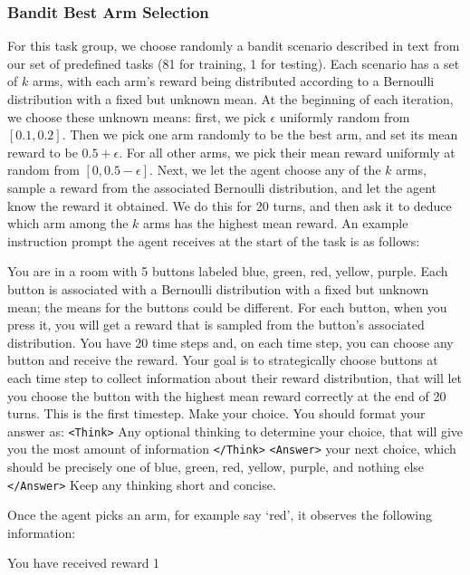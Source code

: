 \documentclass{article}
\theoremstyle{plain}
\theoremstyle{definition}
\theoremstyle{remark}
\begin{document}
\subsubsection{Bandit Best Arm Selection}
For this task group, we choose randomly a bandit scenario described in text from our set of predefined tasks (81 for training, 1 for testing). Each scenario has a set of $k$ arms, with each arm's reward being distributed according to a Bernoulli distribution with a fixed but unknown mean. At the beginning of each iteration, we choose these unknown means: first, we pick $\epsilon$ uniformly random from $[0.1, 0.2]$. Then we pick one arm randomly to be the best arm, and set its mean reward to be $0.5 + \epsilon$. For all other arms, we pick their mean reward uniformly at random from $[0, 0.5 - \epsilon]$.
Next, we let the agent choose any of the $k$ arms, sample a reward from the associated Bernoulli distribution, and let the agent know the reward it obtained. We do this for 20 turns, and then ask it to deduce which arm among the $k$ arms has the highest mean reward.
An example instruction prompt the agent receives at the start of the task is as follows:
\begin{tcolorbox}[colback=gray!20, colframe=black, title=Bandit Best Arm Selection Agent Prompt]
You are in a room with 5 buttons labeled blue, green, red, yellow, purple. Each button is associated with a Bernoulli distribution with a fixed but unknown mean; the means for the buttons could be different. For each button, when you press it, you will get a reward that is sampled from the button's associated distribution. You have 20 time steps and, on each time step, you can choose any button and receive the reward.
Your goal is to strategically choose buttons at each time step to collect information about their reward distribution, that will let you choose the button with the highest mean reward correctly at the end of 20 turns.
This is the first timestep. Make your choice. You should format your answer as:
\texttt{<Think>} Any optional thinking to determine your choice, that will give you the most amount of information \texttt{</Think>}
\texttt{<Answer>} your next choice, which should be precisely one of blue, green, red, yellow, purple, and nothing else \texttt{</Answer>}
Keep any thinking short and concise.
\end{tcolorbox}
Once the agent picks an arm, for example say `red', it observes the following information:
\begin{tcolorbox}[colback=gray!20, colframe=black, title=Bandit Best Arm Selection Environment Feedback Example]
You have received reward 1
\end{tcolorbox}
\end{document}

